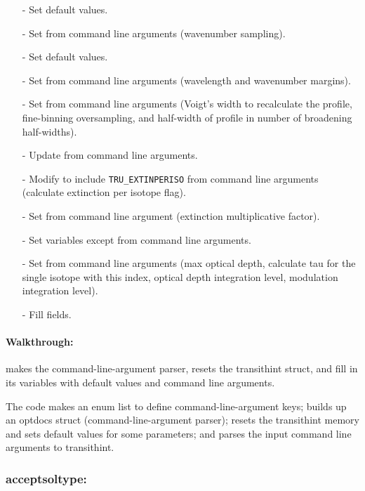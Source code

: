 \documentclass[letterpaper,12pt]{article}
\begin{document}
\begin{enumerate}[leftmargin=10pt, noitemsep, parsep=0pt, topsep=0ex]
\item[-] Set  default values.
\item[-] Set  from command line arguments (wavenumber sampling).
\item[-] Set  default values.
\item[-] Set  from command line arguments
  (wavelength and wavenumber margins).
\item[-] Set  from command line arguments (Voigt's width to
  recalculate the profile, fine-binning oversampling, and half-width
  of profile in number of broadening half-widths).
\item[-] Update  from command line arguments.
\item[-] Modify  to include {\tt TRU\_EXTINPERISO}
  from command line arguments (calculate extinction per isotope flag).
\item[-] Set  from command line argument (extinction
  multiplicative factor).
\item[-] Set  variables except  from command line arguments.
\item[-] Set 
  from command line arguments (max optical depth, calculate tau for
  the single isotope with this index, optical depth integration level,
  modulation integration level).
\item[-] Fill  fields.
\end{enumerate}

\paragraph{Walkthrough:}
makes the command-line-argument parser, resets the transithint struct, and fill in its variables with default values and command line arguments.  

The code makes an enum list to define command-line-argument keys;  
builds up an optdocs struct (command-line-argument parser);  
resets the transithint memory and sets default values for some parameters;  
and parses the input command line arguments to transithint.

\subsubsection{acceptsoltype:}
\end{document}
